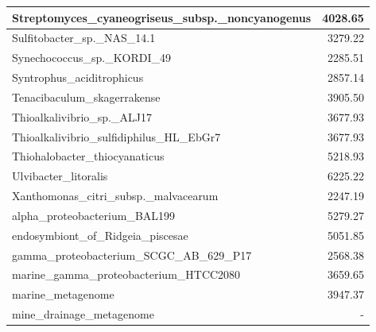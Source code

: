 \documentclass[12pt,a4paper]{article}
\begin{document}
\begin{table}[ht]
\begin{center}
\begin{tabular}{|l*{1}{|r}|}
Streptomyces\_cyaneogriseus\_subsp.\_noncyanogenus & 4028.65 \\ \hline
Sulfitobacter\_sp.\_NAS\_14.1 & 3279.22 \\ \hline
Synechococcus\_sp.\_KORDI\_49 & 2285.51 \\ \hline
Syntrophus\_aciditrophicus & 2857.14 \\ \hline
Tenacibaculum\_skagerrakense & 3905.50 \\ \hline
Thioalkalivibrio\_sp.\_ALJ17 & 3677.93 \\ \hline
Thioalkalivibrio\_sulfidiphilus\_HL\_EbGr7 & 3677.93 \\ \hline
Thiohalobacter\_thiocyanaticus & 5218.93 \\ \hline
Ulvibacter\_litoralis & 6225.22 \\ \hline
Xanthomonas\_citri\_subsp.\_malvacearum & 2247.19 \\ \hline
alpha\_proteobacterium\_BAL199 & 5279.27 \\ \hline
endosymbiont\_of\_Ridgeia\_piscesae & 5051.85 \\ \hline
gamma\_proteobacterium\_SCGC\_AB\_629\_P17 & 2568.38 \\ \hline
marine\_gamma\_proteobacterium\_HTCC2080 & 3659.65 \\ \hline
marine\_metagenome & 3947.37 \\ \hline
mine\_drainage\_metagenome & - \\ \hline
\end{tabular}
\end{center}
\end{table}
\end{document}
